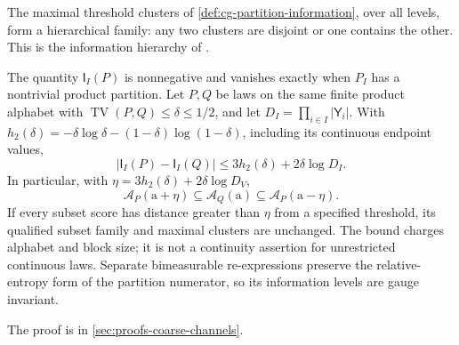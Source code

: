 The maximal threshold clusters of \cref{def:cg-partition-information}, over all levels,
form a hierarchical family: any two clusters are disjoint or one contains the other.
This is the information hierarchy of
\citet[Eqs.~(3.3a)--(3.3b), Thms.~3.1--3.3]{Chan2016InfoClustering}.

The quantity $\mathsf I_I(P)$ is nonnegative and vanishes exactly when $P_I$ has a
nontrivial product partition. Let $P,Q$ be laws on the same finite product alphabet with
$\operatorname{TV}(P,Q)\leq\delta\leq1/2$, and let
$D_I=\prod_{i\in I}|\mathsf Y_i|$. With
$h_2(\delta)=-\delta\log\delta-(1-\delta)\log(1-\delta)$, including its continuous
endpoint values,
\begin{equation}
|\mathsf I_I(P)-\mathsf I_I(Q)|\leq
3h_2(\delta)+2\delta\log D_I.
\label{eq:cg-partition-information-stability}
\end{equation}
In particular, with $\eta=3h_2(\delta)+2\delta\log D_V$,
\begin{equation}
\mathscr A_P(\mathrm a+\eta)\subseteq\mathscr A_Q(\mathrm a)
\subseteq\mathscr A_P(\mathrm a-\eta).
\label{eq:cg-partition-threshold-stability}
\end{equation}
If every subset score has distance greater than $\eta$ from a specified threshold,
its qualified subset family and maximal clusters are unchanged. The bound charges
alphabet and block size; it is not a continuity assertion for unrestricted continuous
laws. Separate bimeasurable re-expressions preserve the relative-entropy form of the
partition numerator, so its information levels are gauge invariant.

The proof is in \cref{sec:proofs-coarse-channels}.

